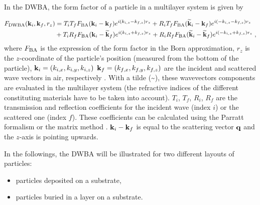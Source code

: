  In the DWBA, the form factor of a particle in a multilayer system is given by

\begin{align}
F_{\rm{DWBA}} (\mathbf{k}_i,\mathbf{k}_f, r_z) & = T_i T_f F_{\rm{BA}} (\mathbf{k}_i-\mathbf{k}_f) e^{i (k_{i,z}-k_{f,z}) r_z} + R_i T_f F_{\rm{BA}}(\mathbf{\widetilde{k}}_i-\mathbf{k}_f) e^{i(-k_{i,z}-k_{f,z})r_z}
 \nonumber \\
  &+ T_i R_f F_{\rm{BA}}(\mathbf{k}_i-\mathbf{\widetilde{k}}_f)e^{i(k_{i,z}+k_{f,z})r_z} + R_iR_fF_{\rm{BA}} (\mathbf{\widetilde{k}}_i-\mathbf{\widetilde{k}}_f)e^{i(-k_{i,z}+k_{f,z})r_z} \; , \label{eq:dwbageneral}
\end{align}
where $F_{\rm{BA}}$ is the expression of the form factor in the Born approximation, $r_z$ is the $z$-coordinate of the particle's position (measured from the bottom of the particle), $\mathbf{k}_i=(k_{i,x}, k_{i,y}, k_{i,z})$ $\mathbf{k}_f=(k_{f,x}, k_{f,y}, k_{f,z})$ are the incident and scattered wave vectors in air, respectively \cite{Raus95}. With a tilde (\~{}), these wavevectors components are evaluated in the multilayer system (the refractive indices of the different constituting materials have to be taken into account). 
$T_i$, $T_f$, $R_i$, $R_f$ are the transmission and reflection coefficients for the incident wave (index $i$) or the scattered one (index $f$). These coefficients can be calculated using the Parratt formalism \cite{Parr54} or the matrix method \cite{BoWo99}. $\mathbf{k}_i-\mathbf{k}_f$ is equal to the scattering vector $\mathbf{q}$ and the $z$-axis is pointing upwards.\\


\vspace{18pt}

In the followings, the DWBA will be illustrated for two different layouts of particles: 
\begin{itemize}
\item particles deposited on a substrate,
\item particles buried in a layer on a substrate.
\end{itemize}


